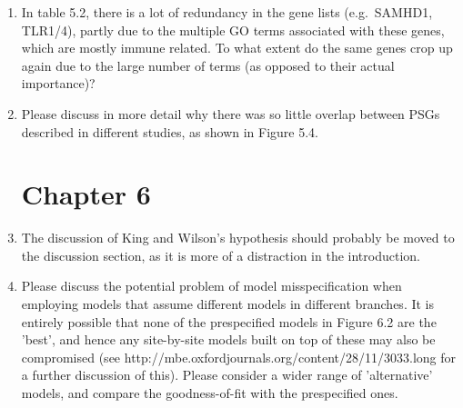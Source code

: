 \begin{enumerate}
\item{ In table 5.2, there is a lot of redundancy in the gene lists
(e.g.\ SAMHD1, TLR1/4), partly due to the multiple GO terms associated
with these genes, which are mostly immune related. To what extent do
the same genes crop up again due to the large number of terms (as
opposed to their actual importance)?


}

\item{ Please discuss in more detail why there was so little overlap between
PSGs described in different studies, as shown in Figure 5.4.

 }

\section{Chapter 6}

\item{ The discussion of King and
  Wilson's hypothesis should probably be moved to the discussion
  section, as it is more of a distraction in the introduction.

 }

\item{ Please discuss the potential
  problem of model misspecification when employing models that assume
  different models in different branches. It is entirely possible that
  none of the prespecified models in Figure 6.2 are the 'best', and
  hence any site-by-site models built on top of these may also be
  compromised (see
  http://mbe.oxfordjournals.org/content/28/11/3033.long for a further
  discussion of this). Please consider a wider range of 'alternative'
  models, and compare the goodness-of-fit with the prespecified ones.

}
\end{enumerate}
